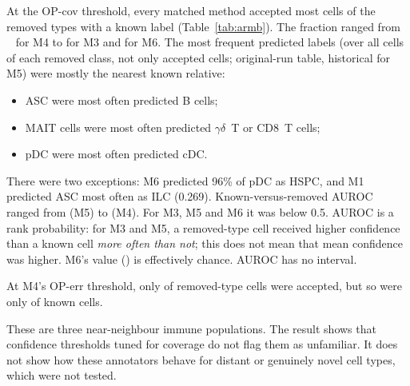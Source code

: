 \documentclass[11pt]{article}
\newcommand{\gd}{$\gamma\delta$~T}
\begin{document}
At the OP-cov threshold, every matched method accepted most cells of the removed types with a known label (Table~\ref{tab:armb}). The fraction ranged from ~ for M4 to  for M3 and  for M6. The most frequent predicted labels (over all cells of each removed class, not only accepted cells; original-run table, historical for M5) were mostly the nearest known relative:
\begin{itemize}
\item ASC were most often predicted B cells;
\item MAIT cells were most often predicted \gd{} or CD8~T cells;
\item pDC were most often predicted cDC.
\end{itemize}
There were two exceptions: M6 predicted 96\% of pDC as HSPC, and M1 predicted ASC most often as ILC (0.269). Known-versus-removed AUROC ranged from  (M5) to  (M4). For M3, M5 and M6 it was below 0.5. AUROC is a rank probability: for M3 and M5, a removed-type cell received higher confidence than a known cell \emph{more often than not}; this does not mean that mean confidence was higher. M6's value () is effectively chance. AUROC has no interval.

At M4's OP-err threshold, only  of removed-type cells were accepted, but so were only  of known cells.

These are three near-neighbour immune populations. The result shows that confidence thresholds tuned for coverage do not flag them as unfamiliar. It does not show how these annotators behave for distant or genuinely novel cell types, which were not tested.
\end{document}
